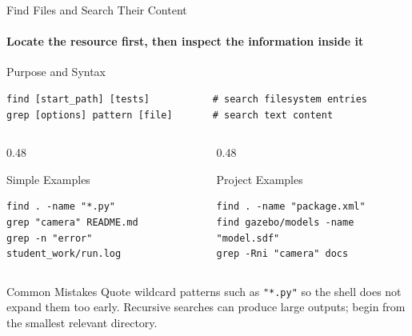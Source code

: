 \begin{frame}[fragile]{Find Files and Search Their Content}
\framesubtitle{Locate the resource first, then inspect the information inside it}

\scriptsize

\begin{block}{Purpose and Syntax}
\begin{verbatim}
find [start_path] [tests]           # search filesystem entries
grep [options] pattern [file]       # search text content
\end{verbatim}
\end{block}

\begin{columns}[T,onlytextwidth]
    \begin{column}{0.48\textwidth}
        \begin{exampleblock}{Simple Examples}
\begin{verbatim}
find . -name "*.py"
grep "camera" README.md
grep -n "error" student_work/run.log
\end{verbatim}
        \end{exampleblock}
    \end{column}

    \begin{column}{0.48\textwidth}
        \begin{exampleblock}{Project Examples}
\begin{verbatim}
find . -name "package.xml"
find gazebo/models -name "model.sdf"
grep -Rni "camera" docs
\end{verbatim}
        \end{exampleblock}
    \end{column}
\end{columns}

\begin{alertblock}{Common Mistakes}
Quote wildcard patterns such as \texttt{"*.py"} so the shell does not expand
them too early. Recursive searches can produce large outputs; begin from the
smallest relevant directory.
\end{alertblock}
\end{frame}


